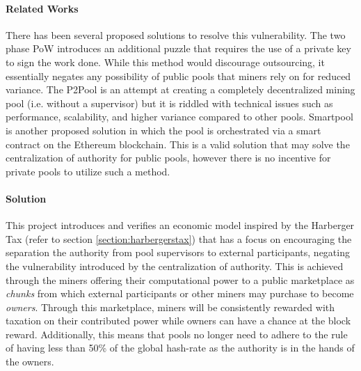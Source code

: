 \paragraph{Related Works} There has been several proposed solutions to resolve this vulnerability. The two phase PoW \cite{bastiaan2015} introduces an additional puzzle that requires the use of a private key to sign the work done. While this method would discourage outsourcing, it essentially negates any possibility of public pools that miners rely on for reduced variance. The P2Pool is an attempt at creating a completely decentralized mining pool (i.e. without a supervisor) but it is riddled with technical issues such as performance, scalability, and higher variance compared to other pools. Smartpool \cite{smartpool2017} is another proposed solution in which the pool is orchestrated via a smart contract on the Ethereum blockchain. This is a valid solution that may solve the centralization of authority for public pools, however there is no incentive for private pools to utilize such a method. 


\paragraph{Solution} This project introduces and verifies an economic model inspired by the Harberger Tax \cite{posnerweyl2017} (refer to section \ref{section:harbergerstax}) that has a focus on encouraging the separation the authority from pool supervisors to external participants, negating the vulnerability introduced by the centralization of authority. This is achieved through the miners offering their computational power to a public marketplace as \textit{chunks} from which external participants or other miners may purchase to become \textit{owners}. Through this marketplace, miners will be consistently rewarded with taxation on their contributed power while owners can have a chance at the block reward. Additionally, this means that pools no longer need to adhere to the rule of having less than 50\% of the global hash-rate as the authority is in the hands of the owners.  


